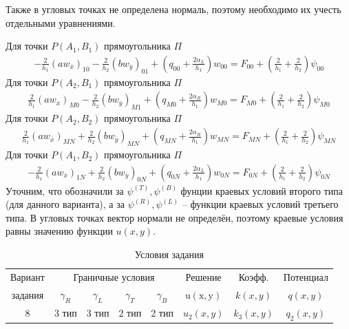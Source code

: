 \documentclass[12pt, fleqn]{article}
\theoremstyle{definition}
\begin{document}
Также в угловых точках не определена нормаль, поэтому необходимо их учесть отдельными уравнениями.

Для точки $P\left(A_{1}, B_{1}\right)$ прямоугольника $\Pi$
\begin{gather}
-\frac{2}{h_{1}}\left(a w_{\overline{x}}\right)_{10} - \frac{2}{h_{2}} \left(b w_{\overline{y}}\right)_{01}+\left(q_{00}+ \frac{2\alpha_{L}}{h_{1}}\right) w_{00}= F_{00}+\left(\frac{2}{h_{1}} + \frac{2}{h_{2}}\right) \psi_{00}
\label{eq:a1b1}
\end{gather}
\vspace{10pt}
Для точки $P\left(A_{2}, B_{1}\right)$ прямоугольника $\Pi$
\begin{gather}
\frac{2}{h_{1}}\left(a w_{\overline{x}}\right)_{M 0}-\frac{2}{h_{2}}\left(b w_{\overline{y}}\right)_{M 1}+\left(q_{M 0}+\frac{2\alpha_{R}}{h_{1}}\right) w_{M 0} = F_{M 0}+\left(\frac{2}{h_{1}}+\frac{2}{h_{2}}\right) \psi_{M 0}
\label{eq:a2b1}
\end{gather}
\vspace{10pt}
Для точки $P\left(A_{2}, B_{2}\right)$ прямоугольника $\Pi$
\begin{gather}
\frac{2}{h_{1}}\left(a w_{\overline{x}}\right)_{M N}+\frac{2}{h_{2}}\left(b w_{\overline{y}}\right)_{M N}+\left(q_{M N}+\frac{2\alpha_{R}}{h_{1}}\right) w_{M N}= F_{M N}+\left(\frac{2}{h_{1}}+\frac{2}{h_{2}}\right) \psi_{M N}
\label{eq:a2b2}
\end{gather}
\vspace{10pt}
Для точки $P\left(A_{1}, B_{2}\right)$ прямоугольника $\Pi$
\begin{gather}
-\frac{2}{h_{1}}\left(a w_{\overline{x}}\right)_{1 N}+\frac{2}{h_{2}}\left(b w_{\overline{y}}\right)_{0 N}+\left(q_{0 N}+\frac{2\alpha_{L}}{h_{1}}\right) w_{0 N}= F_{0 N}+\left(\frac{2}{h_{1}}+\frac{2}{h_{2}}\right) \psi_{0 N}
\label{eq:a1b2}
\end{gather}
Уточним, что обозначили за $\psi^{(T)}, \psi^{(B)}$ фунции краевых условий второго типа (для данного варианта), а  за $\psi^{(R)}, \psi^{(L)}$ -- функции краевых условий третьего типа. В угловых точках вектор нормали не определён, поэтому краевые условия равны значению функции $u(x, y)$.
\begin{table}[!ht]
\begin{tabular}{|c|cccc|c|c|c|}
\hline Вариант & \multicolumn{4}{c|}{ Граничные условия } & Решение & Коэфф. & Потенциал \\
задания & $\gamma_{R}$ & $\gamma_{L}$ & $\gamma_{T}$ & $\gamma_{B}$ & $\mathrm{u}(\mathrm{x}, \mathrm{y})$ & $k(x, y)$ & $q(x, y)$ \\
\hline 8 & 3 тип & 3 тип & 2 тип & 2 тип & $u_{2}(x, y)$ & $k_{3}(x, y)$ & $q_{2}(x, y)$\\
\hline
\end{tabular}
\caption{Условия задания}
\label{tb:variant}
\end{table}
\end{document}
